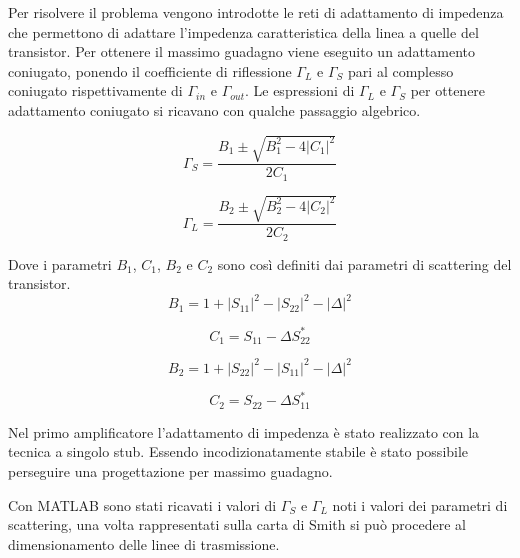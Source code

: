 \documentclass[12pt,oneside]{book}
\begin{document}
Per risolvere il problema vengono introdotte le reti di adattamento di impedenza che permettono di adattare l'impedenza caratteristica della linea a quelle del transistor. Per ottenere il massimo guadagno viene eseguito un adattamento coniugato, ponendo il coefficiente di riflessione $\Gamma_{L}$ e $\Gamma_{S}$ pari al complesso coniugato rispettivamente di $\Gamma_{in}$ e $\Gamma_{out}$. Le espressioni di $\Gamma_{L}$ e $\Gamma_{S}$ per ottenere adattamento coniugato si ricavano con qualche passaggio algebrico.

\begin{equation}
    \Gamma_{S}=\dfrac{B_{1}\pm\sqrt{B_{1}^2-4\left|C_{1}\right|^2}}{2C_{1}}
\end{equation}

\begin{equation}
    \Gamma_{L}=\dfrac{B_{2}\pm\sqrt{B_{2}^2-4\left|C_{2}\right|^2}}{2C_{2}}
\end{equation}

Dove i parametri $B_{1}$, $C_{1}$, $B_{2}$ e $C_{2}$ sono così definiti dai parametri di scattering del transistor.
\begin{equation}
    B_{1} = 1 + \left|S_{11}\right|^{2} - \left|S_{22}\right|^{2} -\left|\Delta\right|^{2}
\end{equation}

\begin{equation}
    C_{1} = S_{11} - \Delta S_{22}^{*}
\end{equation}

\begin{equation}
    B_{2} = 1 + \left|S_{22}\right|^{2} - \left|S_{11}\right|^{2} -\left|\Delta\right|^{2}
\end{equation}

\begin{equation}
    C_{2} = S_{22} - \Delta S_{11}^{*}
\end{equation}



Nel primo amplificatore l'adattamento di impedenza è stato realizzato con la tecnica a singolo stub. Essendo incodizionatamente stabile è stato possibile perseguire una progettazione per massimo guadagno.

Con MATLAB sono stati ricavati i valori di $\Gamma_{S}$ e $\Gamma_{L}$ noti i valori dei parametri di scattering, una volta rappresentati sulla carta di Smith si può procedere al dimensionamento delle linee di trasmissione. 
\end{document}
